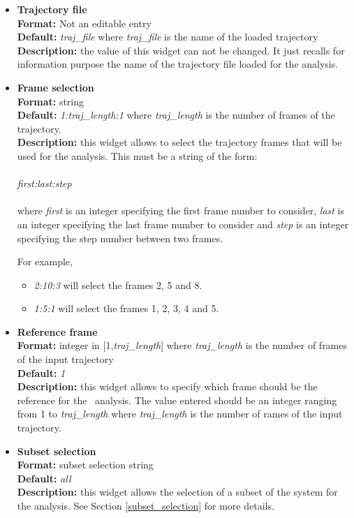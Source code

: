 \documentclass[a4paper,11pt]{report}
\begin{document}
\begin{itemize}
\item \textbf{Trajectory file}\\
\textbf{Format:} Not an editable entry\\
\textbf{Default:} \textit{traj\_file} where \textit{traj\_file} is the name of the loaded trajectory\\
\textbf{Description:} the value of this widget can not be changed. It just recalls for information purpose the name
of the trajectory file loaded for the analysis.

\item \textbf{Frame selection}\\
\textbf{Format:} string\\
\textbf{Default:} \textit{1:traj\_length:1} where \textit{traj\_length} is the number of frames of the trajectory.\\
\textbf{Description:} this widget allows to select the trajectory frames that will be used for the analysis. This must
be a string of the form:
\\\\
\textit{first:last:step}
\\\\
where \textit{first} is an integer specifying the first frame number to consider, \textit{last} is an integer specifying the last 
frame number to consider and \textit{step} is an integer specifying the step number between two frames.

For example,
\begin{itemize}
\item \textit{2:10:3} will select the frames 2, 5 and 8.
\item \textit{1:5:1} will select the frames 1, 2, 3, 4 and 5.
\end{itemize}

\item \textbf{Reference frame}\\
\textbf{Format:} integer in [1,\textit{traj\_length}] where \textit{traj\_length} is the number of frames of the input trajectory\\
\textbf{Default:} \textit{1}\\
\textbf{Description:} this widget allows to specify which frame should be the reference for the \RMSD\ analysis.
The value entered should be an integer ranging from 1 to \textit{traj\_length} where \textit{traj\_length} is the 
number of rames of the input trajectory.

\item \textbf{Subset selection}\\
\textbf{Format:} subset selection string\\
\textbf{Default:} \textit{all}\\
\textbf{Description:} this widget allows the selection of a subset of the system for the analysis. 
See Section \ref{subset_selection} for more details.


\end{itemize}
\end{document}
